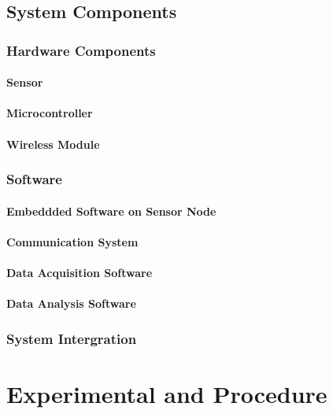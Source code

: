 \documentclass[letterpaper,12pt,titlepage,oneside,final]{book}
\begin{document}
\section{System Components}

\subsection{Hardware Components}

\subsubsection{Sensor}

\subsubsection{Microcontroller}

\subsubsection{Wireless Module}

\subsection{Software}

\subsubsection{Embeddded Software on Sensor Node}

\subsubsection{Communication System}

\subsubsection{Data Acquisition Software}

\subsubsection{Data Analysis Software}

\subsection{System Intergration}

\chapter{Experimental and Procedure}
\end{document}
